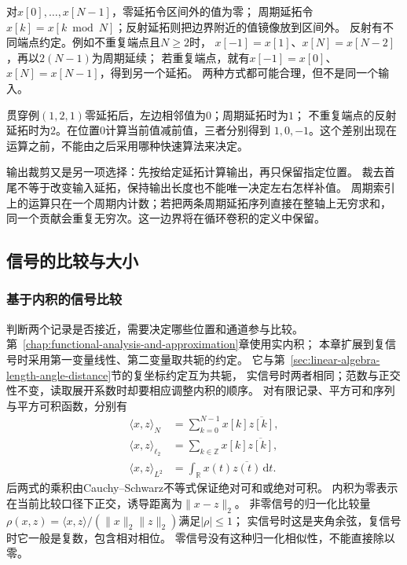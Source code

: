对$x[0],\ldots,x[N-1]$，零延拓令区间外的值为零；
周期延拓令$x[k]=x[k\bmod N]$；反射延拓则把边界附近的值镜像放到区间外。
反射有不同端点约定。例如不重复端点且$N\geq2$时，
$x[-1]=x[1]$、$x[N]=x[N-2]$，再以$2(N-1)$为周期延续；
若重复端点，就有$x[-1]=x[0]$、$x[N]=x[N-1]$，得到另一个延拓。
两种方式都可能合理，但不是同一个输入。

贯穿例$(1,2,1)$零延拓后，左边相邻值为$0$；周期延拓时为$1$；
不重复端点的反射延拓时为$2$。在位置$0$计算当前值减前值，三者分别得到
$1,0,-1$。这个差别出现在运算之前，不能由之后采用哪种快速算法来决定。

输出裁剪又是另一项选择：先按给定延拓计算输出，再只保留指定位置。
裁去首尾不等于改变输入延拓，保持输出长度也不能唯一决定左右怎样补值。
周期索引上的运算只在一个周期内计数；若把两条周期延拓序列直接在整轴上无穷求和，
同一个贡献会重复无穷次。这一边界将在循环卷积的定义中保留。

\subsection{信号的比较与大小}

\subsubsection{基于内积的信号比较}

判断两个记录是否接近，需要决定哪些位置和通道参与比较。
第~\ref{chap:functional-analysis-and-approximation}章使用实内积；
本章扩展到复信号时采用第一变量线性、第二变量取共轭的约定。
它与第~\ref{sec:linear-algebra-length-angle-distance}节的复坐标约定互为共轭，
实信号时两者相同；范数与正交性不变，读取展开系数时却要相应调整内积的顺序。
对有限记录、平方可和序列与平方可积函数，分别有
\begin{equation}
  \begin{aligned}
    \langle x,z\rangle_N&=\sum_{k=0}^{N-1}x[k]\overline{z[k]},\\
    \langle x,z\rangle_{\ell_2}&=\sum_{k\in\mathbb Z}x[k]\overline{z[k]},\\
    \langle x,z\rangle_{L^2}&=\int_{\mathbb R}x(t)\overline{z(t)}\,\mathrm dt.
  \end{aligned}
  \label{eq:signal-inner-products}
\end{equation}
后两式的乘积由Cauchy--Schwarz不等式保证绝对可和或绝对可积。
内积为零表示在当前比较口径下正交，诱导距离为$\|x-z\|_2$。
非零信号的归一化比较量
$\rho(x,z)=\langle x,z\rangle/(\|x\|_2\|z\|_2)$满足$|\rho|\leq1$；
实信号时这是夹角余弦，复信号时它一般是复数，包含相对相位。
零信号没有这种归一化相似性，不能直接除以零。

